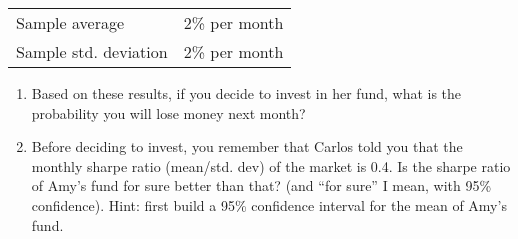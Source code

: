 \documentclass[12pt]{article}
\begin{document}
\noindent 

\begin{table}[h!]
\begin{tabular}{|l|l|}
\hline
Sample average& 2\% per month\\
Sample std. deviation&2\% per month\\
\hline 
\end{tabular}
\end{table} 

\begin{enumerate}
\item Based on these results, if you decide to invest in her fund, what is the probability you will lose money next month?
\vspace{5cm}
 \item  Before deciding to invest, you remember that Carlos told you that the monthly sharpe ratio  (mean/std. dev) of the market is 0.4.  Is the sharpe ratio of Amy's fund for sure better than that? (and ``for sure'' I mean, with 95\% confidence). Hint: first build a 95\% confidence interval for the mean of Amy's fund. 
\end{enumerate}
\end{document}
